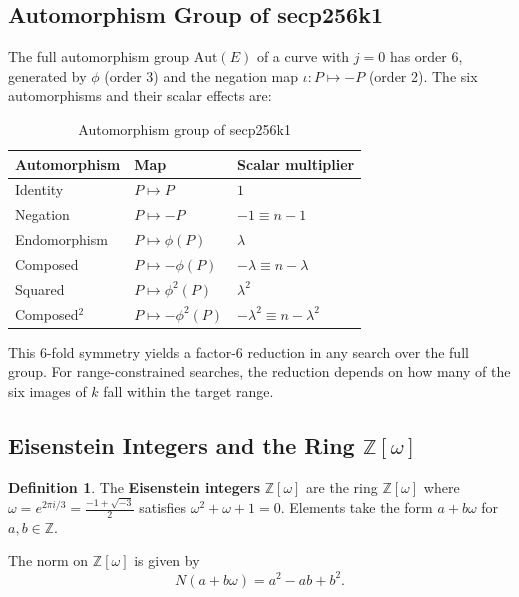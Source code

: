 \documentclass[11pt,a4paper]{article}
\theoremstyle{definition}
\newtheorem{definition}{Definition}[section]
\newcommand{\Zomega}{\mathbb{Z}[\omega]}
\begin{document}
\subsection{Automorphism Group of secp256k1}

The full automorphism group $\mathrm{Aut}(E)$ of a curve with $j = 0$ has order 6, generated by $\phi$ (order 3) and the negation map $\iota: P \mapsto -P$ (order 2). The six automorphisms and their scalar effects are:

\begin{table}[htbp]
\centering
\caption{Automorphism group of secp256k1}\label{tab:aut}
\begin{tabular}{lll}
\toprule
Automorphism & Map & Scalar multiplier \\
\midrule
Identity & $P \mapsto P$ & $1$ \\
Negation & $P \mapsto -P$ & $-1 \equiv n - 1$ \\
Endomorphism & $P \mapsto \phi(P)$ & $\lambda$ \\
Composed & $P \mapsto -\phi(P)$ & $-\lambda \equiv n - \lambda$ \\
Squared & $P \mapsto \phi^2(P)$ & $\lambda^2$ \\
Composed$^2$ & $P \mapsto -\phi^2(P)$ & $-\lambda^2 \equiv n - \lambda^2$ \\
\bottomrule
\end{tabular}
\end{table}

This 6-fold symmetry yields a factor-6 reduction in any search over the full group. For range-constrained searches, the reduction depends on how many of the six images of $k$ fall within the target range.

\subsection{Eisenstein Integers and the Ring $\Zomega$}

\begin{definition}
The \textbf{Eisenstein integers} $\Zomega$ are the ring $\mathbb{Z}[\omega]$ where $\omega = e^{2\pi i/3} = \frac{-1 + \sqrt{-3}}{2}$ satisfies $\omega^2 + \omega + 1 = 0$. Elements take the form $a + b\omega$ for $a, b \in \mathbb{Z}$.
\end{definition}

The norm on $\Zomega$ is given by
\begin{equation}
N(a + b\omega) = a^2 - ab + b^2.
\end{equation}
\end{document}
